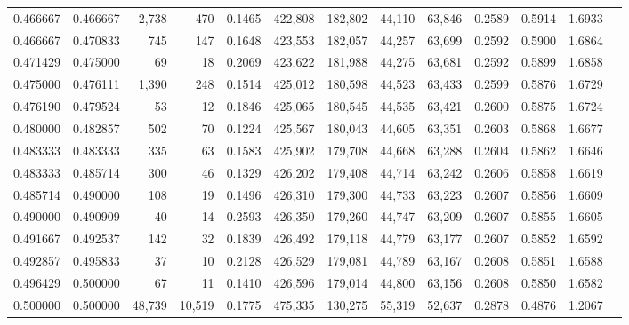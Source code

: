 \begin{tabular}{rrrrrrrrrrrrr}
0.466667 & 0.466667 &  2,738 &    470 &                                     0.1465 & 422,808 & 182,802 &  44,110 &  63,846 & 0.2589 & 0.5914 & 1.6933 \\
0.466667 & 0.470833 &    745 &    147 &                                     0.1648 & 423,553 & 182,057 &  44,257 &  63,699 & 0.2592 & 0.5900 & 1.6864 \\
0.471429 & 0.475000 &     69 &     18 &                                     0.2069 & 423,622 & 181,988 &  44,275 &  63,681 & 0.2592 & 0.5899 & 1.6858 \\
0.475000 & 0.476111 &  1,390 &    248 &                                     0.1514 & 425,012 & 180,598 &  44,523 &  63,433 & 0.2599 & 0.5876 & 1.6729 \\
0.476190 & 0.479524 &     53 &     12 &                                     0.1846 & 425,065 & 180,545 &  44,535 &  63,421 & 0.2600 & 0.5875 & 1.6724 \\
0.480000 & 0.482857 &    502 &     70 &                                     0.1224 & 425,567 & 180,043 &  44,605 &  63,351 & 0.2603 & 0.5868 & 1.6677 \\
0.483333 & 0.483333 &    335 &     63 &                                     0.1583 & 425,902 & 179,708 &  44,668 &  63,288 & 0.2604 & 0.5862 & 1.6646 \\
0.483333 & 0.485714 &    300 &     46 &                                     0.1329 & 426,202 & 179,408 &  44,714 &  63,242 & 0.2606 & 0.5858 & 1.6619 \\
0.485714 & 0.490000 &    108 &     19 &                                     0.1496 & 426,310 & 179,300 &  44,733 &  63,223 & 0.2607 & 0.5856 & 1.6609 \\
0.490000 & 0.490909 &     40 &     14 &                                     0.2593 & 426,350 & 179,260 &  44,747 &  63,209 & 0.2607 & 0.5855 & 1.6605 \\
0.491667 & 0.492537 &    142 &     32 &                                     0.1839 & 426,492 & 179,118 &  44,779 &  63,177 & 0.2607 & 0.5852 & 1.6592 \\
0.492857 & 0.495833 &     37 &     10 &                                     0.2128 & 426,529 & 179,081 &  44,789 &  63,167 & 0.2608 & 0.5851 & 1.6588 \\
0.496429 & 0.500000 &     67 &     11 &                                     0.1410 & 426,596 & 179,014 &  44,800 &  63,156 & 0.2608 & 0.5850 & 1.6582 \\
0.500000 & 0.500000 & 48,739 & 10,519 &                                     0.1775 & 475,335 & 130,275 &  55,319 &  52,637 & 0.2878 & 0.4876 & 1.2067 \\

\end{tabular}

